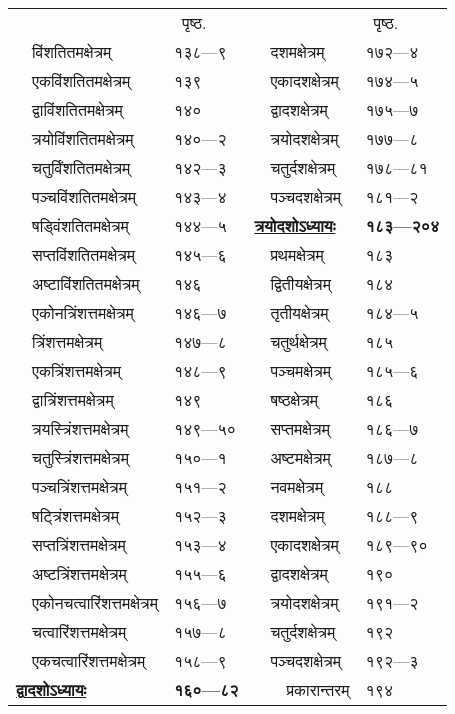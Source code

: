 \documentclass[11pt, openany]{book}
\begin{document}
\newpage
\begin{center}
\begin{tabular}{p{1.4in} l | p{1.4in} l}
& ~पृष्ठ. & & ~पृष्ठ.\\
~~विंशतितमक्षेत्रम् & १३८---९ & ~~दशमक्षेत्रम् & १७२---४\\
~~एकविंशतितमक्षेत्रम् & १३९ & ~~एकादशक्षेत्रम् & १७४---५\\
~~द्वाविंशतितमक्षेत्रम् & १४० & ~~द्वादशक्षेत्रम् & १७५---७\\
~~त्रयोविंशतितमक्षेत्रम् & १४०---२ & ~~त्रयोदशक्षेत्रम् & १७७---८\\
~~चतुर्विंशतितमक्षेत्रम् & १४२---३ & ~~चतुर्दशक्षेत्रम् & १७८---८१\\
~~पञ्चविंशतितमक्षेत्रम् & १४३---४ & ~~पञ्चदशक्षेत्रम् & १८१---२\\
~~षड्विंशतितमक्षेत्रम् & १४४---५ & \hyperref[ch13]{\textbf{त्रयोदशोऽध्यायः}} & \textbf{१८३---२०४}\\
~~सप्तविंशतितमक्षेत्रम् & १४५---६ & ~~प्रथमक्षेत्रम् & १८३\\
~~अष्टाविंशतितमक्षेत्रम् & १४६ & ~~द्वितीयक्षेत्रम् & १८४\\
~~एकोनत्रिंशत्तमक्षेत्रम् & १४६---७ & ~~तृतीयक्षेत्रम् & १८४---५\\
~~त्रिंशत्तमक्षेत्रम् & १४७---८ & ~~चतुर्थक्षेत्रम् & १८५\\
~~एकत्रिंशत्तमक्षेत्रम् & १४८---९ & ~~पञ्चमक्षेत्रम् & १८५---६\\
~~द्वात्रिंशत्तमक्षेत्रम् & १४९ & ~~षष्ठक्षेत्रम् & १८६\\
~~त्रयस्त्रिंशत्तमक्षेत्रम् & १४९---५० & ~~सप्तमक्षेत्रम् & १८६---७\\
~~चतुस्त्रिंशत्तमक्षेत्रम् & १५०---१ & ~~अष्टमक्षेत्रम् & १८७---८\\
~~पञ्चत्रिंशत्तमक्षेत्रम् & १५१---२ & ~~नवमक्षेत्रम् & १८८\\
~~षट्त्रिंशत्तमक्षेत्रम् & १५२---३ & ~~दशमक्षेत्रम् & १८८---९\\
~~सप्तत्रिंशत्तमक्षेत्रम् & १५३---४ & ~~एकादशक्षेत्रम् & १८९---९०\\
~~अष्टत्रिंशत्तमक्षेत्रम् & १५५---६ & ~~द्वादशक्षेत्रम् & १९०\\
~~एकोनचत्वारिंशत्तमक्षेत्रम् & १५६---७ & ~~त्रयोदशक्षेत्रम् & १९१---२\\
~~चत्वारिंशत्तमक्षेत्रम् & १५७---८ & ~~चतुर्दशक्षेत्रम् & १९२\\
~~एकचत्वारिंशत्तमक्षेत्रम् & १५८---९ & ~~पञ्चदशक्षेत्रम् & १९२---३\\
\hyperref[ch12]{\textbf{द्वादशोऽध्यायः}} & \textbf{ १६०---८२} & ~~~~प्रकारान्तरम् & १९४\\

\end{tabular}
\end{center}
\end{document}
